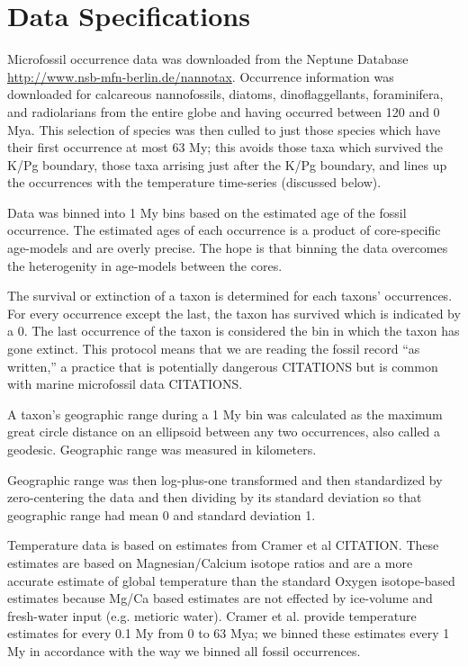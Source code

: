 \documentclass[12pt,letterpaper]{article}
\begin{document}
\section{Data Specifications}

Microfossil occurrence data was downloaded from the Neptune Database \url{http://www.nsb-mfn-berlin.de/nannotax}. Occurrence information was downloaded for calcareous nannofossils, diatoms, dinoflaggellants, foraminifera, and radiolarians from the entire globe and having occurred between 120 and 0 Mya. This selection of species was then culled to just those species which have their first occurrence at most 63 My; this avoids those taxa which survived the K/Pg boundary, those taxa arrising just after the K/Pg boundary, and lines up the occurrences with the temperature time-series (discussed below).

Data was binned into 1 My bins based on the estimated age of the fossil occurrence. The estimated ages of each occurrence is a product of core-specific age-models and are overly precise. The hope is that binning the data overcomes the heterogenity in age-models between the cores. 

The survival or extinction of a taxon is determined for each taxons' occurrences. For every occurrence except the last, the taxon has survived which is indicated by a 0. The last occurrence of the taxon is considered the bin in which the taxon has gone extinct. This protocol means that we are reading the fossil record ``as written,'' a practice that is potentially dangerous CITATIONS but is common with marine microfossil data CITATIONS.

A taxon's geographic range during a 1 My bin was calculated as the maximum great circle distance on an ellipsoid between any two occurrences, also called a geodesic. Geographic range was measured in kilometers.

Geographic range was then log-plus-one transformed and then standardized by zero-centering the data and then dividing by its standard deviation so that geographic range had mean 0 and standard deviation 1.

Temperature data is based on estimates from Cramer et al CITATION. These estimates are based on Magnesian/Calcium isotope ratios and are a more accurate estimate of global temperature than the standard Oxygen isotope-based estimates because Mg/Ca based estimates are not effected by ice-volume and fresh-water input (e.g. metioric water). Cramer et al. provide temperature estimates for every 0.1 My from 0 to 63 Mya; we binned these estimates every 1 My in accordance with the way we binned all fossil occurrences.
\end{document}
